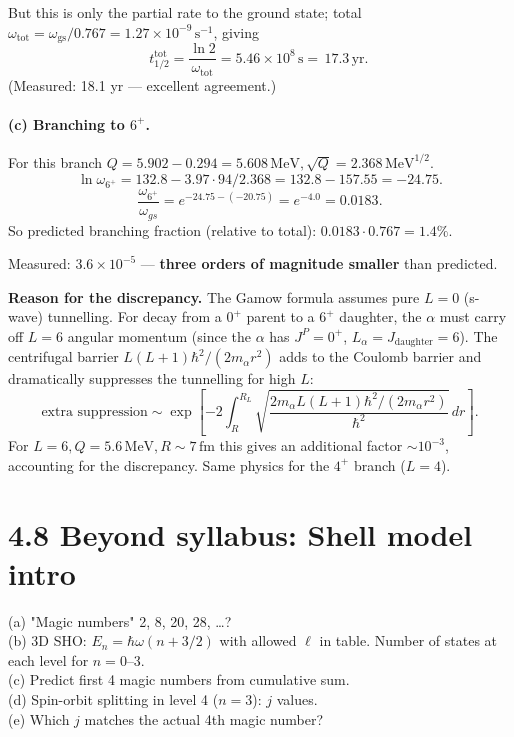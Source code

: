 \documentclass[11pt]{article}
\newcommand{\Q}[1]{\begin{question}#1\end{question}}
\newcommand{\fm}{\,\mathrm{fm}}
\newcommand{\MeV}{\,\mathrm{MeV}}
\begin{document}
But this is only the partial rate to the ground state; total $\omega_\mathrm{tot}=\omega_\mathrm{gs}/0.767=1.27\times 10^{-9}\,\mathrm{s^{-1}}$, giving
\[
t_{1/2}^\mathrm{tot}=\frac{\ln 2}{\omega_\mathrm{tot}}=5.46\times 10^{8}\,\mathrm{s}=\boxed{\,17.3\,\mathrm{yr}.\,}
\]
(Measured: 18.1 yr --- excellent agreement.)

\paragraph{(c) Branching to $6^+$.} For this branch $Q=5.902-0.294=5.608\MeV,\sqrt{Q}=2.368\MeV^{1/2}$.
\[
\ln\omega_{6^+}=132.8-3.97\cdot 94/2.368=132.8-157.55=-24.75.
\]
\[
\frac{\omega_{6^+}}{\omega_{gs}}=e^{-24.75-(-20.75)}=e^{-4.0}=0.0183.
\]
So predicted branching fraction (relative to total): $0.0183\cdot 0.767=1.4\%$.

Measured: $3.6\times 10^{-5}$ --- \textbf{three orders of magnitude smaller} than predicted.

\textbf{Reason for the discrepancy.} The Gamow formula assumes pure $L=0$ (s-wave) tunnelling. For decay from a $0^+$ parent to a $6^+$ daughter, the $\alpha$ must carry off $L=6$ angular momentum (since the $\alpha$ has $J^P=0^+$, $L_\alpha=J_\mathrm{daughter}=6$). The centrifugal barrier $L(L+1)\hbar^{2}/(2 m_\alpha r^{2})$ adds to the Coulomb barrier and dramatically suppresses the tunnelling for high $L$:
\[
\text{extra suppression}\sim\exp\!\left[-2\int_R^{R_L}\sqrt{\frac{2 m_\alpha L(L+1)\hbar^{2}/(2 m_\alpha r^{2})}{\hbar^{2}}}\,dr\right].
\]
For $L=6,Q=5.6\MeV,R\sim 7\fm$ this gives an additional factor $\sim 10^{-3}$, accounting for the discrepancy. Same physics for the $4^+$ branch ($L=4$).

\section*{4.8 \quad Beyond syllabus: Shell model intro}

\Q{(a) "Magic numbers" 2, 8, 20, 28, \ldots ?\\
(b) 3D SHO: $E_n=\hbar\omega(n+3/2)$ with allowed $\ell$ in table. Number of states at each level for $n=0$--3.\\
(c) Predict first 4 magic numbers from cumulative sum.\\
(d) Spin-orbit splitting in level 4 ($n=3$): $j$ values.\\
(e) Which $j$ matches the actual 4th magic number?}
\end{document}
